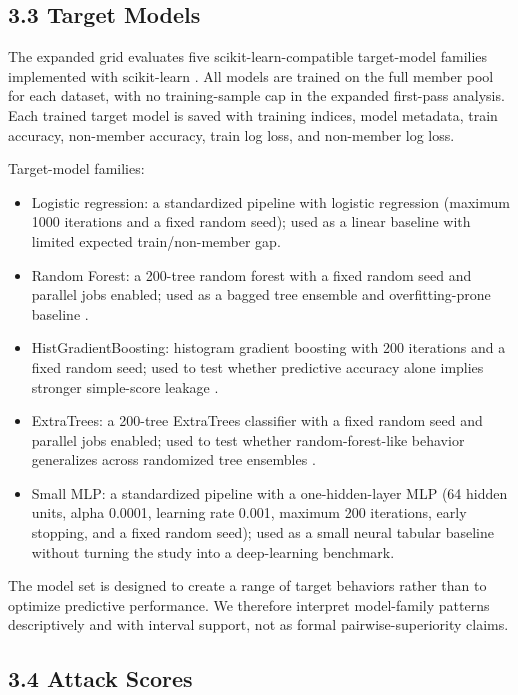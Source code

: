 \documentclass[
  10pt,
  twocolumn]{article}
\providecommand{\tightlist}{%
  \setlength{\itemsep}{0pt}\setlength{\parskip}{0pt}}
\begin{document}
\hypertarget{target-models}{%
\subsection{3.3 Target Models}\label{target-models}}

The expanded grid evaluates five scikit-learn-compatible target-model families implemented with scikit-learn \cite{ref-25}. All models are trained on the full member pool for each dataset, with no training-sample cap in the expanded first-pass analysis. Each trained target model is saved with training indices, model metadata, train accuracy, non-member accuracy, train log loss, and non-member log loss.

Target-model families:

\begin{itemize}
\tightlist
\item
  Logistic regression: a standardized pipeline with logistic regression (maximum 1000 iterations and a fixed random seed); used as a linear baseline with limited expected train/non-member gap.
\item
  Random Forest: a 200-tree random forest with a fixed random seed and parallel jobs enabled; used as a bagged tree ensemble and overfitting-prone baseline \cite{ref-31}.
\item
  HistGradientBoosting: histogram gradient boosting with 200 iterations and a fixed random seed; used to test whether predictive accuracy alone implies stronger simple-score leakage \cite{ref-33}.
\item
  ExtraTrees: a 200-tree ExtraTrees classifier with a fixed random seed and parallel jobs enabled; used to test whether random-forest-like behavior generalizes across randomized tree ensembles \cite{ref-32}.
\item
  Small MLP: a standardized pipeline with a one-hidden-layer MLP (64 hidden units, alpha 0.0001, learning rate 0.001, maximum 200 iterations, early stopping, and a fixed random seed); used as a small neural tabular baseline without turning the study into a deep-learning benchmark.
\end{itemize}

The model set is designed to create a range of target behaviors rather than to optimize predictive performance. We therefore interpret model-family patterns descriptively and with interval support, not as formal pairwise-superiority claims.

\hypertarget{attack-scores}{%
\subsection{3.4 Attack Scores}\label{attack-scores}}
\end{document}
